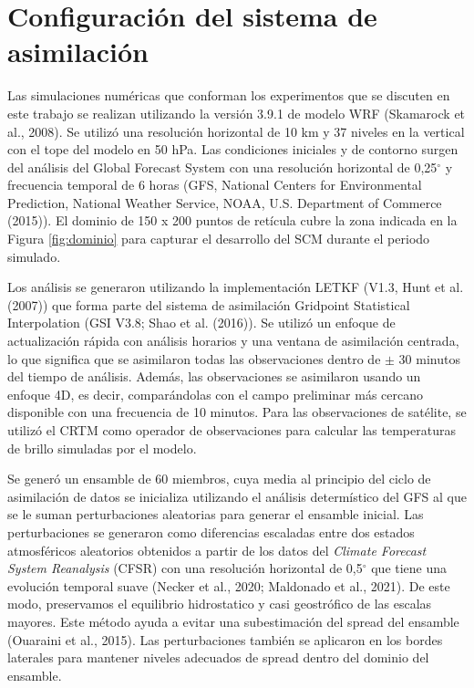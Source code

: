 \documentclass[12pt,oneside,a4paper]{reedthesis}
\begin{document}
\hypertarget{configmodelo}{%
\section{Configuración del sistema de asimilación}\label{configmodelo}}

Las simulaciones numéricas que conforman los experimentos que se discuten en este trabajo se realizan utilizando la versión 3.9.1 de modelo WRF (Skamarock et al., 2008).
Se utilizó una resolución horizontal de 10 km y 37 niveles en la vertical con el tope del modelo en 50 hPa.
Las condiciones iniciales y de contorno surgen del análisis del Global Forecast System con una resolución horizontal de 0,25\(^{\circ}\) y frecuencia temporal de 6 horas (GFS, National Centers for Environmental Prediction, National Weather Service, NOAA, U.S. Department of Commerce (2015)).
El dominio de 150 x 200 puntos de retícula cubre la zona indicada en la Figura \ref{fig:dominio} para capturar el desarrollo del SCM durante el periodo simulado.

Los análisis se generaron utilizando la implementación LETKF (V1.3, Hunt et al. (2007)) que forma parte del sistema de asimilación Gridpoint Statistical Interpolation (GSI V3.8; Shao et al. (2016)).
Se utilizó un enfoque de actualización rápida con análisis horarios y una ventana de asimilación centrada, lo que significa que se asimilaron todas las observaciones dentro de \(\pm\) 30 minutos del tiempo de análisis.
Además, las observaciones se asimilaron usando un enfoque 4D, es decir, comparándolas con el campo preliminar más cercano disponible con una frecuencia de 10 minutos.
Para las observaciones de satélite, se utilizó el CRTM como operador de observaciones para calcular las temperaturas de brillo simuladas por el modelo.

Se generó un ensamble de 60 miembros, cuya media al principio del ciclo de asimilación de datos se inicializa utilizando el análisis determístico del GFS al que se le suman perturbaciones aleatorias para generar el ensamble inicial. Las perturbaciones se generaron como diferencias escaladas entre dos estados atmosféricos aleatorios obtenidos a partir de los datos del \emph{Climate Forecast System Reanalysis} (CFSR) con una resolución horizontal de 0,5\(^{\circ}\) que tiene una evolución temporal suave (Necker et al., 2020; Maldonado et al., 2021). De este modo, preservamos el equilibrio hidrostatico y casi geostrófico de las escalas mayores. Este método ayuda a evitar una subestimación del spread del ensamble (Ouaraini et al., 2015). Las perturbaciones también se aplicaron en los bordes laterales para mantener niveles adecuados de spread dentro del dominio del ensamble.
\end{document}
